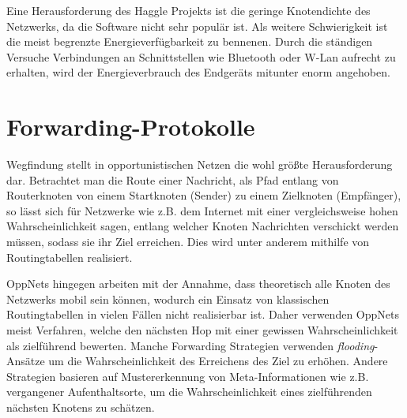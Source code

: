 \documentclass[a4paper, 12pt]{article}
\begin{document}
Eine Herausforderung des Haggle Projekts ist die geringe Knotendichte des Netzwerks, da die Software nicht sehr populär ist. Als weitere Schwierigkeit ist die meist begrenzte Energieverfügbarkeit zu bennenen. Durch die ständigen Versuche Verbindungen an Schnittstellen wie Bluetooth oder W-Lan aufrecht zu erhalten, wird der Energieverbrauch des Endgeräts mitunter enorm angehoben.

\section{Forwarding-Protokolle}
\label{sec:forwarding}
Wegfindung stellt in opportunistischen Netzen die wohl größte Herausforderung dar.
Betrachtet man die Route einer Nachricht, als Pfad entlang von Routerknoten von einem Startknoten (Sender) zu einem Zielknoten (Empfänger), so lässt sich für Netzwerke wie z.B. dem Internet mit einer vergleichsweise hohen Wahrscheinlichkeit sagen, entlang welcher Knoten Nachrichten verschickt werden müssen, sodass sie ihr Ziel erreichen. Dies wird unter anderem mithilfe von Routingtabellen realisiert.

OppNets hingegen arbeiten mit der Annahme, dass theoretisch alle Knoten des Netzwerks mobil sein können, wodurch ein Einsatz von klassischen Routingtabellen in vielen Fällen nicht realisierbar ist.
Daher verwenden OppNets meist Verfahren, welche den nächsten Hop mit einer gewissen Wahrscheinlichkeit als zielführend bewerten. Manche Forwarding Strategien verwenden \emph{flooding}-Ansätze um die Wahrscheinlichkeit des Erreichens des Ziel zu erhöhen. Andere Strategien basieren auf Mustererkennung von Meta-Informationen wie z.B. vergangener Aufenthaltsorte, um die Wahrscheinlichkeit eines zielführenden nächsten Knotens zu schätzen.
\end{document}
